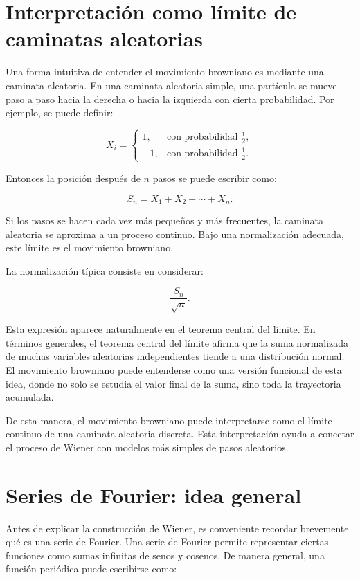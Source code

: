\documentclass[12pt]{article}
\begin{document}
\section{Interpretación como límite de caminatas aleatorias}

Una forma intuitiva de entender el movimiento browniano es mediante una caminata aleatoria. En una caminata aleatoria simple, una partícula se mueve paso a paso hacia la derecha o hacia la izquierda con cierta probabilidad. Por ejemplo, se puede definir:

\[
X_i=
\begin{cases}
1, & \text{con probabilidad } \frac{1}{2},\\
-1, & \text{con probabilidad } \frac{1}{2}.
\end{cases}
\]

Entonces la posición después de $n$ pasos se puede escribir como:

\[
S_n=X_1+X_2+\cdots+X_n.
\]

Si los pasos se hacen cada vez más pequeños y más frecuentes, la caminata aleatoria se aproxima a un proceso continuo. Bajo una normalización adecuada, este límite es el movimiento browniano.

La normalización típica consiste en considerar:

\[
\frac{S_n}{\sqrt{n}}.
\]

Esta expresión aparece naturalmente en el teorema central del límite. En términos generales, el teorema central del límite afirma que la suma normalizada de muchas variables aleatorias independientes tiende a una distribución normal. El movimiento browniano puede entenderse como una versión funcional de esta idea, donde no solo se estudia el valor final de la suma, sino toda la trayectoria acumulada.

De esta manera, el movimiento browniano puede interpretarse como el límite continuo de una caminata aleatoria discreta. Esta interpretación ayuda a conectar el proceso de Wiener con modelos más simples de pasos aleatorios.

\section{Series de Fourier: idea general}

Antes de explicar la construcción de Wiener, es conveniente recordar brevemente qué es una serie de Fourier. Una serie de Fourier permite representar ciertas funciones como sumas infinitas de senos y cosenos. De manera general, una función periódica puede escribirse como:
\end{document}
